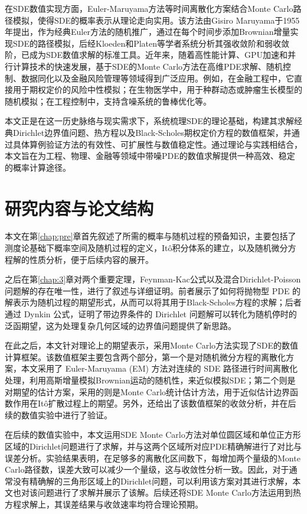 \documentclass[oneside]{sysuthesis}
\begin{document}
在SDE数值实现方面，Euler-Maruyama方法\cite{Maruyama1955}等时间离散化方案结合Monte Carlo路径模拟，使得SDE的概率表示从理论走向实用。该方法由Gisiro Maruyama于1955年提出，作为经典Euler方法的随机推广，通过在每个时间步添加Brownian增量实现SDE的路径模拟，后经Kloeden和Platen等学者系统分析其强收敛阶和弱收敛阶\cite{KloedenPlaten1992}，已成为SDE数值求解的标准工具。近年来，随着高性能计算、GPU加速和并行计算技术的快速发展，基于SDE的Monte Carlo方法在高维PDE求解、随机控制、数据同化以及金融风险管理等领域得到广泛应用。例如，在金融工程中，它直接用于期权定价的风险中性模拟；在生物医学中，用于种群动态或肿瘤生长模型的随机模拟；在工程控制中，支持含噪系统的鲁棒优化等。

本文正是在这一历史脉络与现实需求下，系统梳理SDE的理论基础，构建其求解经典Dirichlet边界值问题、热方程以及Black-Scholes期权定价方程的数值框架，并通过具体算例验证方法的有效性、可扩展性与数值稳定性。通过理论与实践相结合，本文旨在为工程、物理、金融等领域中带噪PDE的数值求解提供一种高效、稳定的概率计算途径。

\section{研究内容与论文结构}

本文在第\ref{chap:pre}章首先叙述了所需的概率与随机过程的预备知识，主要包括了测度论基础下概率空间及随机过程的定义，It\^o积分体系的建立，以及随机微分方程解的性质分析，便于后续内容的展开。

之后在第\ref{chap:3}章对两个重要定理，Feynman-Kac公式以及混合Dirichlet-Poisson问题解的存在唯一性，进行了叙述与详细证明。前者展示了如何将抛物型 PDE 的解表示为随机过程的期望形式，从而可以将其用于Black-Scholes方程的求解；后者通过 Dynkin 公式，证明了带边界条件的 Dirichlet 问题解可以转化为随机停时的泛函期望，这为处理复杂几何区域的边界值问题提供了新思路。

在此之后，本文针对理论上的期望表示，采用Monte Carlo方法实现了SDE的数值计算框架。该数值框架主要包含两个部分，第一个是对随机微分方程的离散化方案，本文采用了 Euler-Maruyama (EM) 方法对连续的 SDE 路径进行时间离散化处理，利用高斯增量模拟Brownian运动的随机性，来近似模拟SDE；第二个则是对期望的估计方案，采用的则是Monte Carlo统计估计方法，用于近似估计边界函数作用在It\^o扩散过程上的期望。另外，还给出了该数值框架的收敛分析，并在后续的数值实验中进行了验证。

在后续的数值实验中，本文运用SDE Monte Carlo方法对单位圆区域和单位正方形区域的Dirichlet问题进行了求解，并与这两个区域所对应PDE精确解进行了对比与误差分析。实验结果表明，在足够多的离散化区间数下，每增加两个量级的Monte Carlo路径数，误差大致可以减少一个量级，这与收敛性分析一致。因此，对于通常没有精确解的三角形区域上的Dirichlet问题，可以利用该方案对其进行求解，本文也对该问题进行了求解并展示了该解。后续还将SDE Monte Carlo方法运用到热方程求解上，其误差结果与收敛速率均符合理论预期。
\end{document}
